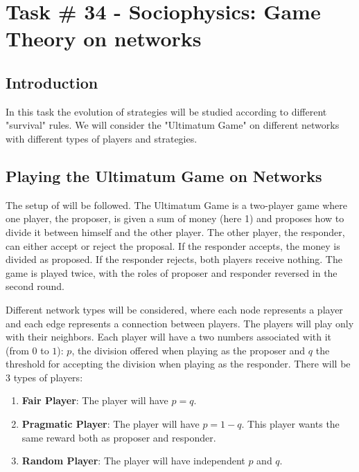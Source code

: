 \chapter{Task \# 34 - Sociophysics: Game Theory on networks}


\section{Introduction}
 
In this task the evolution of strategies will be studied according to different "survival" rules. We will consider the "Ultimatum Game" on different networks with different types of players and strategies.

\section{Playing the Ultimatum Game on Networks}


The setup of \cite{UltimatumGame} will be followed. The Ultimatum Game is a two-player game where one player, the proposer, is given a sum of money (here 1) and proposes how to divide it between himself and the other player. The other player, the responder, can either accept or reject the proposal. If the responder accepts, the money is divided as proposed. If the responder rejects, both players receive nothing. The game is played twice, with the roles of proposer and responder reversed in the second round.


Different network types will be considered, where each node represents a player and each edge represents a connection between players. The players will play only with their neighbors. Each player will have a two numbers associated with it (from $0$ to $1$): $p$, the division offered when playing as the proposer and $q$ the threshold for accepting the division when playing as the responder.
There will be 3 types of players:
\begin{enumerate}[label=(\Alph*)]
    \item \textbf{Fair Player}: The player will have $p = q$.
    \item \textbf{Pragmatic Player}: The player will have $p = 1 - q$. This player wants the same reward both as proposer and responder.
    \item \textbf{Random Player}: The player will have independent $p$ and $q$.
\end{enumerate}

